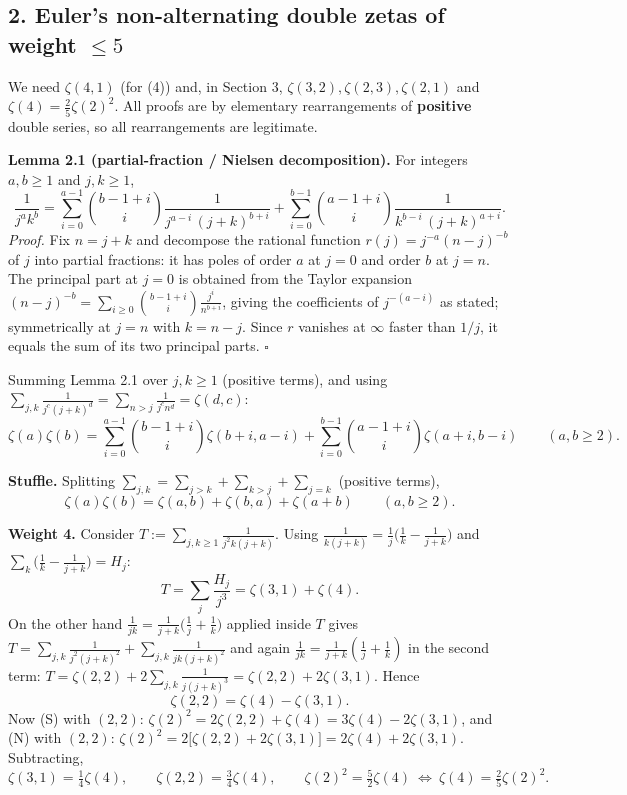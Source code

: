\documentclass[11pt]{article}
\theoremstyle{remark}
\begin{document}
\subsection*{2. Euler's non-alternating double zetas of weight $\le5$}

We need $\zeta(4,1)$ (for (4)) and, in Section 3, $\zeta(3,2),\zeta(2,3),\zeta(2,1)$ and
$\zeta(4)=\tfrac25\zeta(2)^2$. All proofs are by elementary rearrangements of \textbf{positive} double
series, so all rearrangements are legitimate.

\textbf{Lemma 2.1 (partial-fraction / Nielsen decomposition).} For integers $a,b\ge1$ and $j,k\ge1$,
\[
\frac{1}{j^ak^b}=\sum_{i=0}^{a-1}\binom{b-1+i}{i}\frac{1}{j^{a-i}\,(j+k)^{b+i}}
+\sum_{i=0}^{b-1}\binom{a-1+i}{i}\frac{1}{k^{b-i}\,(j+k)^{a+i}} .
\]
\textit{Proof.} Fix $n=j+k$ and decompose the rational function $r(j)=j^{-a}(n-j)^{-b}$ of $j$ into partial
fractions: it has poles of order $a$ at $j=0$ and order $b$ at $j=n$. The principal part at $j=0$ is
obtained from the Taylor expansion $(n-j)^{-b}=\sum_{i\ge0}\binom{b-1+i}{i}\frac{j^i}{n^{b+i}}$,
giving the coefficients of $j^{-(a-i)}$ as stated; symmetrically at $j=n$ with $k=n-j$. Since $r$
vanishes at $\infty$ faster than $1/j$, it equals the sum of its two principal parts. $\square$

Summing Lemma 2.1 over $j,k\ge1$ (positive terms), and using
$\sum_{j,k}\frac{1}{j^{c}(j+k)^{d}}=\sum_{n>j}\frac{1}{j^cn^d}=\zeta(d,c)$:
\begin{equation}
\zeta(a)\zeta(b)=\sum_{i=0}^{a-1}\binom{b-1+i}{i}\zeta(b+i,a-i)
+\sum_{i=0}^{b-1}\binom{a-1+i}{i}\zeta(a+i,b-i)\qquad(a,b\ge2). \tag{N}
\end{equation}

\textbf{Stuffle.} Splitting $\sum_{j,k}=\sum_{j>k}+\sum_{k>j}+\sum_{j=k}$ (positive terms),
\begin{equation}
\zeta(a)\zeta(b)=\zeta(a,b)+\zeta(b,a)+\zeta(a+b)\qquad(a,b\ge2). \tag{S}
\end{equation}

\textbf{Weight 4.} Consider $T:=\sum_{j,k\ge1}\frac{1}{j^2k(j+k)}$. Using
$\frac{1}{k(j+k)}=\frac1j\big(\frac1k-\frac1{j+k}\big)$ and $\sum_k\big(\frac1k-\frac1{j+k}\big)=H_j$:
\[
T=\sum_j\frac{H_j}{j^3}=\zeta(3,1)+\zeta(4).
\]
On the other hand $\frac{1}{jk}=\frac{1}{j+k}\big(\frac1j+\frac1k\big)$ applied inside $T$ gives
$T=\sum_{j,k}\frac{1}{j^2(j+k)^2}+\sum_{j,k}\frac{1}{jk(j+k)^2}$
and again $\frac{1}{jk}=\frac1{j+k}(\frac1j+\frac1k)$ in the second term:
$T=\zeta(2,2)+2\sum_{j,k}\frac{1}{j(j+k)^3}=\zeta(2,2)+2\zeta(3,1)$. Hence
\[
\zeta(2,2)=\zeta(4)-\zeta(3,1).
\]
Now (S) with $(2,2)$: $\zeta(2)^2=2\zeta(2,2)+\zeta(4)=3\zeta(4)-2\zeta(3,1)$, and (N) with $(2,2)$:
$\zeta(2)^2=2\big[\zeta(2,2)+2\zeta(3,1)\big]=2\zeta(4)+2\zeta(3,1)$. Subtracting,
\begin{equation}
\zeta(3,1)=\tfrac14\zeta(4),\qquad \zeta(2,2)=\tfrac34\zeta(4),\qquad
\zeta(2)^2=\tfrac52\zeta(4)\ \Longleftrightarrow\ \zeta(4)=\tfrac25\zeta(2)^2. \tag{5}
\end{equation}
\end{document}
